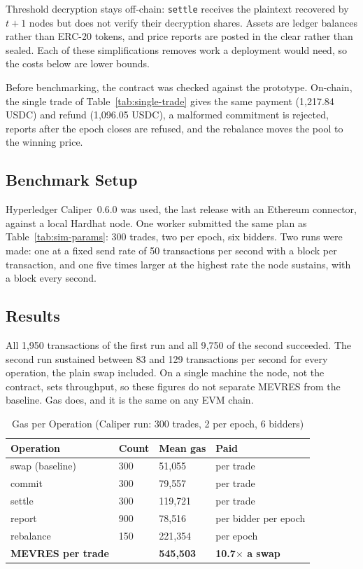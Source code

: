 Threshold decryption stays off-chain: \texttt{settle} receives the plaintext recovered by $t+1$ nodes but does not verify their decryption shares. Assets are ledger balances rather than ERC-20 tokens, and price reports are posted in the clear rather than sealed. Each of these simplifications removes work a deployment would need, so the costs below are lower bounds.

Before benchmarking, the contract was checked against the prototype. On-chain, the single trade of Table~\ref{tab:single-trade} gives the same payment (1{,}217.84 USDC) and refund (1{,}096.05 USDC), a malformed commitment is rejected, reports after the epoch closes are refused, and the rebalance moves the pool to the winning price.

\subsection{Benchmark Setup}

Hyperledger Caliper~0.6.0 was used, the last release with an Ethereum connector, against a local Hardhat node. One worker submitted the same plan as Table~\ref{tab:sim-params}: 300 trades, two per epoch, six bidders. Two runs were made: one at a fixed send rate of 50 transactions per second with a block per transaction, and one five times larger at the highest rate the node sustains, with a block every second.

\subsection{Results}

All 1{,}950 transactions of the first run and all 9{,}750 of the second succeeded. The second run sustained between 83 and 129 transactions per second for every operation, the plain swap included. On a single machine the node, not the contract, sets throughput, so these figures do not separate MEVRES from the baseline. Gas does, and it is the same on any EVM chain.

\begin{table}[h]
\centering
\caption{Gas per Operation (Caliper run: 300 trades, 2 per epoch, 6 bidders)}
\label{tab:gas}
\begin{tabular}{|L{3.6cm}|C{2.0cm}|C{2.6cm}|C{3.8cm}|}
\hline
\textbf{Operation} & \textbf{Count} & \textbf{Mean gas} & \textbf{Paid} \\
\hline
swap (baseline) & 300 & 51{,}055 & per trade \\
\hline
commit & 300 & 79{,}557 & per trade \\
\hline
settle & 300 & 119{,}721 & per trade \\
\hline
report & 900 & 78{,}516 & per bidder per epoch \\
\hline
rebalance & 150 & 221{,}354 & per epoch \\
\hline
\textbf{MEVRES per trade} & & \textbf{545{,}503} & \textbf{10.7$\times$ a swap} \\
\hline
\end{tabular}
\end{table}

